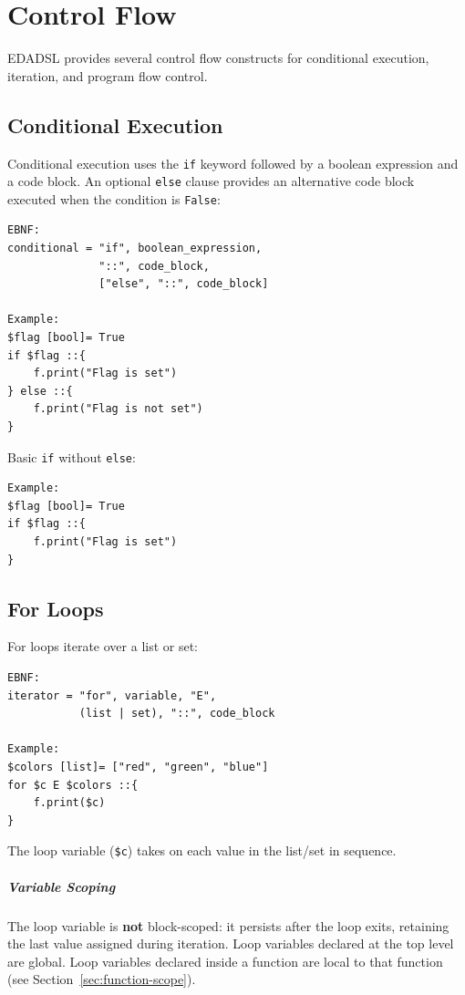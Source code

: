 \documentclass{report}
\begin{document}
\chapter{Control Flow}
EDADSL provides several control flow constructs for conditional execution, iteration, and program flow control.

\section{Conditional Execution}
Conditional execution uses the \texttt{if} keyword followed by a boolean expression and a code block. An optional \texttt{else} clause provides an alternative code block executed when the condition is \texttt{False}:
\begin{verbatim}
EBNF:
conditional = "if", boolean_expression, 
              "::", code_block,
              ["else", "::", code_block]

Example:
$flag [bool]= True
if $flag ::{
    f.print("Flag is set")
} else ::{
    f.print("Flag is not set")
}
\end{verbatim}

Basic \texttt{if} without \texttt{else}:
\begin{verbatim}
Example:
$flag [bool]= True
if $flag ::{
    f.print("Flag is set")
}
\end{verbatim}

\section{For Loops}
For loops iterate over a list or set:
\begin{verbatim}
EBNF:
iterator = "for", variable, "E", 
           (list | set), "::", code_block

Example:
$colors [list]= ["red", "green", "blue"]
for $c E $colors ::{
    f.print($c)
}
\end{verbatim}
The loop variable (\texttt{\$c}) takes on each value in the list/set in sequence.

\paragraph{Variable Scoping}
The loop variable is \textbf{not} block-scoped: it persists after the loop exits, retaining the last value assigned during iteration. Loop variables declared at the top level are global. Loop variables declared inside a function are local to that function (see Section~\ref{sec:function-scope}).
\end{document}
